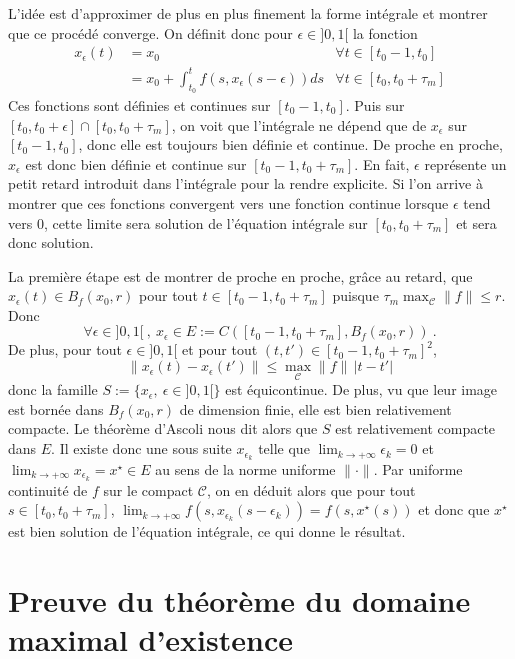 L'idée est d'approximer de plus en plus finement la forme intégrale et
montrer que ce procédé converge. On définit donc pour
\(\epsilon \in ]0,1[\) la fonction \begin{align*}
x_\epsilon(t) &= x_0 & \forall t\in [t_0-1,t_0] \\
&= x_0 + \int_{t_0}^t f(s,x_\epsilon(s-\epsilon)) ds & \forall t\in [t_0,t_0+\tau_m]
\end{align*} Ces fonctions sont définies et continues sur
\([t_0-1,t_0]\). Puis sur \([t_0,t_0+\epsilon]\cap[t_0,t_0+\tau_m]\), on
voit que l'intégrale ne dépend que de \(x_\epsilon\) sur
\([t_0-1,t_0]\), donc elle est toujours bien définie et continue. De
proche en proche, \(x_\epsilon\) est donc bien définie et continue sur
\([t_0-1,t_0+\tau_m]\). En fait, \(\epsilon\) représente un petit retard
introduit dans l'intégrale pour la rendre explicite. Si l'on arrive à
montrer que ces fonctions convergent vers une fonction continue lorsque
\(\epsilon\) tend vers 0, cette limite sera solution de l'équation
intégrale sur \([t_0,t_0+\tau_m]\) et sera donc solution.

La première étape est de montrer de proche en proche, grâce au retard,
que \(x_\epsilon(t)\in B_f(x_0,r)\) pour tout
\(t\in [t_0-1,t_0+\tau_m]\) puisque
\(\tau_m\max_\mathcal{C}\|f\|\leq r\). Donc \[
\forall \epsilon \in ]0,1[ \ , \ x_\epsilon \in E:=C([t_0-1,t_0+\tau_m],B_f(x_0,r)) \ .
\] De plus, pour tout \(\epsilon \in ]0,1[\) et pour tout
\((t,t')\in [t_0-1,t_0+\tau_m]^2\), \[
\|x_\epsilon(t) - x_\epsilon(t') \| \leq \max_\mathcal{C}\|f\| \, |t-t'|
\] donc la famille \(S:=\{x_\epsilon , \ \epsilon \in ]0,1[ \}\) est
équicontinue. De plus, vu que leur image est bornée dans \(B_f(x_0,r)\)
de dimension finie, elle est bien relativement compacte. Le
théorème d'Ascoli nous dit alors que \(S\) est relativement compacte
dans \(E\). Il existe donc une sous suite \(x_{\epsilon_k}\) telle que
\(\lim_{k\to +\infty} \epsilon_k =0\) et
\(\lim_{k\to +\infty} x_{\epsilon_k} = x^\star \in E\) au sens de la
norme uniforme \(\|\cdot \|\). Par uniforme continuité de \(f\) sur le
compact \(\mathcal{C}\), on en déduit alors que pour tout
\(s\in [t_0,t_0+\tau_m]\),
\(\lim_{k\to +\infty} f(s,x_{\epsilon_k}(s-\epsilon_k))= f(s,x^\star(s))\)
et donc que \(x^\star\) est bien solution de l'équation intégrale, ce
qui donne le résultat.

\hypertarget{pr_theo_bouts}{%
\section{Preuve du théorème du domaine maximal
d'existence}\label{pr_theo_bouts}}

